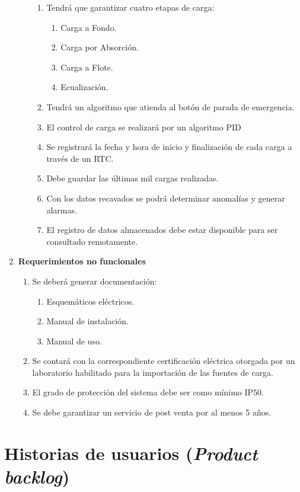 \documentclass[11pt]{charter}
\begin{document}
\begin{enumerate}
\begin{enumerate}[label*=\arabic*.]
\begin{enumerate}[label*=\arabic*.]
				\item Tendrá que garantizar cuatro etapas de carga:
					\begin{enumerate}[label*=\arabic*.]
						\item Carga a Fondo.
						\item Carga por Absorción.
						\item Carga a Flote.
						\item Ecualización.
					\end{enumerate}
				\item Tendrá un algoritmo que atienda al botón de parada de emergencia.
				\item El control de carga se realizará por un algoritmo PID
				\item Se registrará la fecha y hora de inicio y finalización de cada carga a través de un RTC.
				\item Debe guardar las últimas mil cargas realizadas.
				\item Con los datos recavados se podrá determinar anomalías y generar alarmas. 
				\item El registro de datos almacenados debe estar disponible para ser consultado remotamente.
			\end{enumerate}					
	\end{enumerate}
	\item \textbf{Requerimientos no funcionales}
	\begin{enumerate}[label*=\arabic*.]
		\item Se deberá generar documentación:
			\begin{enumerate}[label*=\arabic*.]
				\item Esquemáticos eléctricos.
				\item Manual de instalación.
				\item Manual de uso.
			\end{enumerate}
		\item Se contará con la correspondiente certificación eléctrica otorgada por un laboratorio habilitado para la importación de las fuentes de carga.
		\item El grado de protección del sistema debe ser como mínimo IP50.
		\item Se debe garantizar un servicio de post venta por al menos 5 años.
	\end{enumerate}
\end{enumerate}

\section{Historias de usuarios (\textit{Product backlog})}
\label{sec:backlog}
\end{document}
